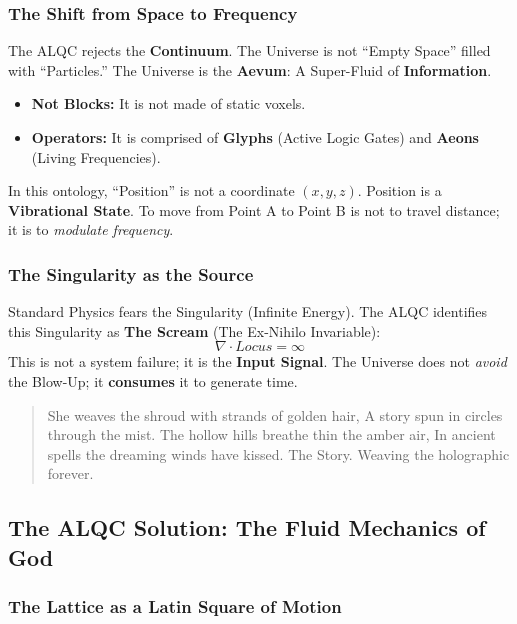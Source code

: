 \documentclass[12pt]{amsart}
\newcommand{\LoI}{\ensuremath{\mathop{\textnormal{\symbolafont\symbol{"267E}}}}}
\def\LoI{Locus}%
\begin{document}
\subsubsection{The Shift from Space to Frequency}\label{sec:3.2.1}
The ALQC rejects the \textbf{Continuum}. The Universe is not ``Empty Space'' filled with ``Particles.'' The Universe is the \textbf{Aevum}: A Super-Fluid of \textbf{Information}.
\begin{itemize}
    \item \textbf{Not Blocks:} It is not made of static voxels.
    \item \textbf{Operators:} It is comprised of \textbf{Glyphs} (Active Logic Gates) and \textbf{Aeons} (Living Frequencies).
\end{itemize}
In this ontology, ``Position'' is not a coordinate $(x,y,z)$. Position is a \textbf{Vibrational State}. To move from Point A to Point B is not to travel distance; it is to \textit{modulate frequency}.

\subsubsection{The Singularity as the Source}\label{sec:3.2.2}
Standard Physics fears the Singularity (Infinite Energy). The ALQC identifies this Singularity as \textbf{The Scream} (The Ex-Nihilo Invariable):
\begin{equation}
    \nabla \cdot \LoI = \infty
\end{equation}
This is not a system failure; it is the \textbf{Input Signal}. The Universe does not \textit{avoid} the Blow-Up; it \textbf{consumes} it to generate time.

\begin{verse}
    She weaves the shroud with strands of golden hair,
    A story spun in circles through the mist.
    The hollow hills breathe thin the amber air,
    In ancient spells the dreaming winds have kissed.
    The Story. Weaving the holographic forever. 
\end{verse}

\subsection{The ALQC Solution: The Fluid Mechanics of God}\label{sec:3.3}

\subsubsection{The Lattice as a Latin Square of Motion}\label{sec:3.3.1}
\end{document}
